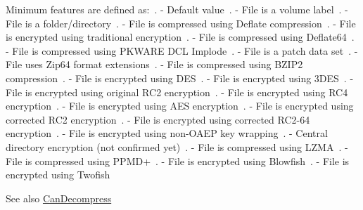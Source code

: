 Minimum features are defined as\+:~. -\/ Default value~. -\/ File is a volume label~. -\/ File is a folder/directory~. -\/ File is compressed using Deflate compression~. -\/ File is encrypted using traditional encryption~. -\/ File is compressed using Deflate64~. -\/ File is compressed using P\+K\+W\+A\+RE D\+CL Implode~. -\/ File is a patch data set~. -\/ File uses Zip64 format extensions~. -\/ File is compressed using B\+Z\+I\+P2 compression~. -\/ File is encrypted using D\+ES~. -\/ File is encrypted using 3\+D\+ES~. -\/ File is encrypted using original R\+C2 encryption~. -\/ File is encrypted using R\+C4 encryption~. -\/ File is encrypted using A\+ES encryption~. -\/ File is encrypted using corrected R\+C2 encryption~. -\/ File is encrypted using corrected R\+C2-\/64 encryption~. -\/ File is encrypted using non-\/\+O\+A\+EP key wrapping~. -\/ Central directory encryption (not confirmed yet)~. -\/ File is compressed using L\+Z\+MA~. -\/ File is compressed using P\+P\+M\+D+~. -\/ File is encrypted using Blowfish~. -\/ File is encrypted using Twofish~\newline
 

\begin{DoxySeeAlso}{See also}
\hyperlink{class_i_c_sharp_code_1_1_sharp_zip_lib_1_1_zip_1_1_zip_entry_a4d8f5443da5c03733c18fc6c488418c7}{Can\+Decompress}


\end{DoxySeeAlso}
\mbox{\label{class_i_c_sharp_code_1_1_sharp_zip_lib_1_1_zip_1_1_zip_entry_aa21e51486a25ad4d1c491ebfa44b4fb1}} 
